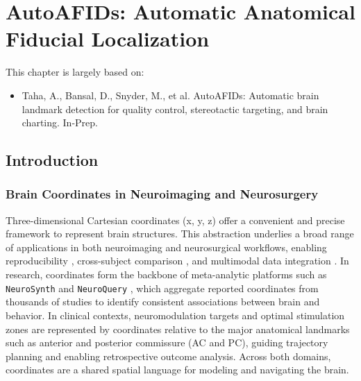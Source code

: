 \chapter{AutoAFIDs: Automatic Anatomical Fiducial Localization} \label{chap:AutoAFIDs}
\newpage
\sloppy
This chapter is largely based on:
\begin{itemize}[noitemsep,topsep=0pt]
	\item Taha, A., Bansal, D., Snyder, M., et al. AutoAFIDs: Automatic brain landmark detection for quality control, stereotactic targeting, and brain charting. In-Prep.
\end{itemize}

\section{Introduction}
\subsection{Brain Coordinates in Neuroimaging and Neurosurgery}
Three-dimensional Cartesian coordinates (x, y, z) offer a convenient and precise framework to represent brain structures. This abstraction underlies a broad range of applications in both neuroimaging and neurosurgical workflows, enabling reproducibility \cite{Dockes2020-nw}, cross-subject comparison \cite{Glasser2016-ko}, and multimodal data integration \cite{Uludag2014-qz}. In research, coordinates form the backbone of meta-analytic platforms such as \texttt{NeuroSynth} \cite{Yarkoni2011-sr} and \texttt{NeuroQuery} \cite{Dockes2020-nw}, which aggregate reported coordinates from thousands of studies to identify consistent associations between brain and behavior. In clinical contexts, neuromodulation targets and optimal stimulation zones are represented by coordinates relative to the major anatomical landmarks \cite{Horn2017-bi} such as anterior and posterior commissure (AC and PC), guiding trajectory planning and enabling retrospective outcome analysis. Across both domains, coordinates are a shared spatial language for modeling and navigating the brain.


